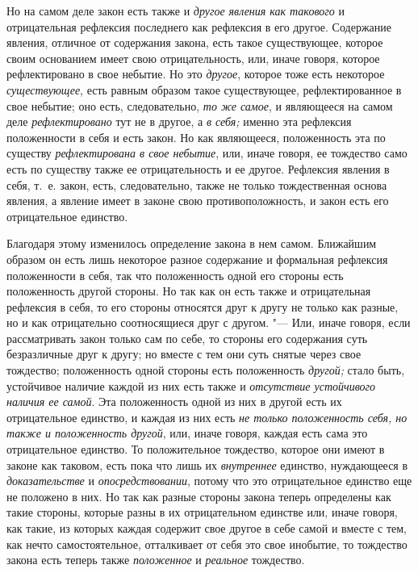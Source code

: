 Но на самом деле закон есть также и {\em другое явления
как такового} и отрицательная рефлексия последнего как рефлексия в его
другое. Содержание явления, отличное от содержания закона, есть такое
существующее, которое своим основанием имеет свою отрицательность, или,
иначе говоря, которое рефлектировано в свое небытие. Но это
{\em другое}, которое тоже есть некоторое
{\em существующее}, есть равным образом такое
существующее, рефлектированное в свое небытие; оно есть, следовательно,
{\em то же самое}, и являющееся на самом деле
{\em рефлектировано} тут не в другое, а
{\em в себя;} именно эта рефлексия положенности в себя
и есть закон. Но как являющееся, положенность эта по существу
{\em рефлектирована в свое небытие}, или, иначе говоря,
ее тождество само есть по существу также ее отрицательность и ее другое.
Рефлексия явления в себя, т.~е. закон, есть, следовательно, также не только
тождественная основа явления, а явление имеет в законе свою
противоположность, и закон есть его отрицательное единство.

Благодаря этому изменилось определение закона в нем самом. Ближайшим образом
он есть лишь некоторое разное содержание и формальная рефлексия
положенности в себя, так что положенность одной его стороны есть
положенность другой стороны. Но так как он есть также и отрицательная
рефлексия в себя, то его стороны относятся друг к другу не только как
разные, но и как отрицательно соотносящиеся друг с другом. "--- Или, иначе
говоря, если рассматривать закон только сам по себе, то стороны его
содержания суть безразличные друг к другу; но вместе с тем они суть снятые
через свое тождество; положенность одной стороны есть положенность
{\em другой;} стало быть, устойчивое наличие каждой из
них есть также и {\em отсутствие устойчивого наличия ее
самой}. Эта положенность одной из них в другой есть их отрицательное
единство, и каждая из них есть {\em не только
положенность себя, но также и положенность другой}, или, иначе говоря,
каждая есть сама это отрицательное единство. То положительное тождество,
которое они имеют в законе как таковом, есть пока что лишь их
{\em внутреннее} единство, нуждающееся в
{\em доказательстве} и
{\em опосредствовании}, потому что это отрицательное
единство еще не положено в них. Но так как разные стороны закона теперь
определены как такие стороны, которые разны в их отрицательном единстве
или, иначе говоря, как такие, из которых каждая содержит свое другое в себе
самой и вместе с тем, как нечто самостоятельное, отталкивает от себя это
свое инобытие, то тождество закона есть теперь также
{\em положенное} и {\em реальное}
тождество.

